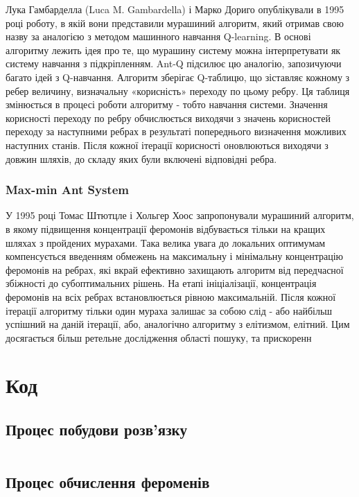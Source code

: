 \documentclass[a4paper, 12pt]{article}
\numberwithin{equation}{section}
\begin{document}
Лука Гамбарделла (Luca M. Gambardella) і Марко Дориго опублікували в 1995 році роботу, в якій вони представили мурашиний алгоритм, який отримав свою назву за аналогією з методом машинного навчання Q-learning. В основі алгоритму лежить ідея про те, що мурашину систему можна інтерпретувати як систему навчання з підкріпленням. Ant-Q підсилює цю аналогію, запозичуючи багато ідей з Q-навчання.
Алгоритм зберігає Q-таблицю, що зіставляє кожному з ребер величину, визначальну «корисність» переходу по цьому ребру. Ця таблиця змінюється в процесі роботи алгоритму - тобто навчання системи. Значення корисності переходу по ребру обчислюється виходячи з значень корисностей переходу за наступними ребрах в результаті попереднього визначення можливих наступних станів. Після кожної ітерації корисності оновлюються виходячи з довжин шляхів, до складу яких були включені відповідні ребра.

\subsubsection{Max-min Ant System}

У 1995 році Томас Штютцле і Хольгер Хоос запропонували мурашиний алгоритм, в якому підвищення концентрації феромонів відбувається тільки на кращих шляхах з пройдених мурахами. Така велика увага до локальних оптимумам компенсується введенням обмежень на максимальну і мінімальну концентрацію феромонів на ребрах, які вкрай ефективно захищають алгоритм від передчасної збіжності до субоптимальних рішень.
На етапі ініціалізації, концентрація феромонів на всіх ребрах встановлюється рівною максимальній. Після кожної ітерації алгоритму тільки один мураха залишає за собою слід - або найбільш успішний на даній ітерації, або, аналогічно алгоритму з елітизмом, елітний. Цим досягається більш ретельне дослідження області пошуку, та  прискоренн

\section{Код}

\subsection{Процес побудови розв'язку}
\inputminted{python}{../../code/knapsack/generate_solution.py}

\subsection{Процес обчислення фероменів}
\end{document}

